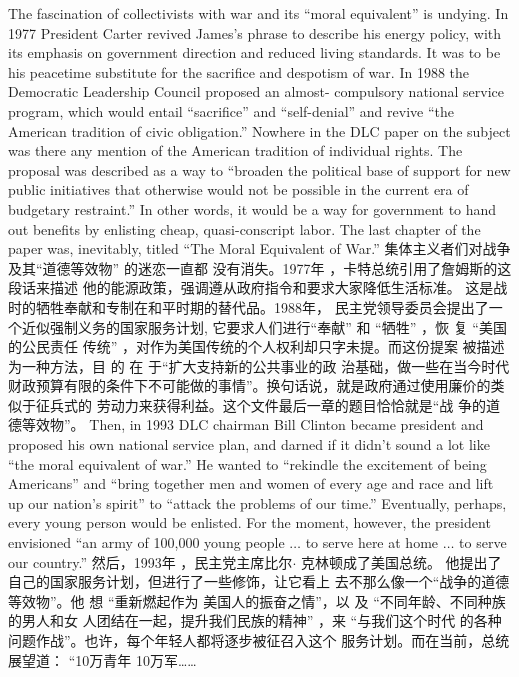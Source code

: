 \begin{paracol}{2}
\switchcolumn*
The fascination of collectivists with war and its ``moral equivalent'' is undying. In 1977 President Carter revived James's
phrase to describe his energy policy, with its emphasis on government direction and reduced living standards. It was to be his
peacetime substitute for the sacrifice and despotism of war. In
1988 the Democratic Leadership Council proposed an almost-
compulsory national service program, which would entail ``sacrifice'' and ``self-denial'' and revive ``the American tradition of
civic obligation.'' Nowhere in the DLC paper on the subject was
there any mention of the American tradition of individual
rights. The proposal was described as a way to ``broaden the political base of support for new public initiatives that otherwise would not be possible in the current era of budgetary restraint.''
In other words, it would be a way for government to hand out
benefits by enlisting cheap, quasi-conscript labor. The last
chapter of the paper was, inevitably, titled ``The Moral Equivalent of War.''
\switchcolumn
集体主义者们对战争及其“道德等效物” 的迷恋一直都
没有消失。1977年 ，卡特总统引用了詹姆斯的这段话来描述
他的能源政策，强调遵从政府指令和要求大家降低生活标准。
这是战时的牺牲奉献和专制在和平时期的替代品。1988年，
民主党领导委员会提出了一个近似强制义务的国家服务计划,
它要求人们进行“奉献” 和 “牺牲” ，恢 复 “美国的公民责任
传统” ，对作为美国传统的个人权利却只字未提。而这份提案
被描述为一种方法，目 的 在 于“扩大支持新的公共事业的政
治基础，做一些在当今时代财政预算有限的条件下不可能做的事情”。换句话说，就是政府通过使用廉价的类似于征兵式的
劳动力来获得利益。这个文件最后一章的题目恰恰就是“战
争的道德等效物”。
\switchcolumn*
Then, in 1993 DLC chairman Bill Clinton became president
and proposed his own national service plan, and darned if it
didn't sound a lot like ``the moral equivalent of war.'' He
wanted to ``rekindle the excitement of being Americans'' and
``bring together men and women of every age and race and lift
up our nation's spirit'' to ``attack the problems of our time.''
Eventually, perhaps, every young person would be enlisted. For
the moment, however, the president envisioned ``an army of
100,000 young people $\ldots$ to serve here at home $\ldots$ to serve
our country.''
\switchcolumn
然后，1993年 ，民主党主席比尔$\cdot$ 克林顿成了美国总统。
他提出了自己的国家服务计划，但进行了一些修饰，让它看上
去不那么像一个“战争的道德等效物”。他 想 “重新燃起作为
美国人的振奋之情”，以 及 “不同年龄、不同种族的男人和女
人团结在一起，提升我们民族的精神” ，来 “与我们这个时代
的各种问题作战”。也许，每个年轻人都将逐步被征召入这个
服务计划。而在当前，总统展望道： “10万青年 10万军……

\end{paracol}
